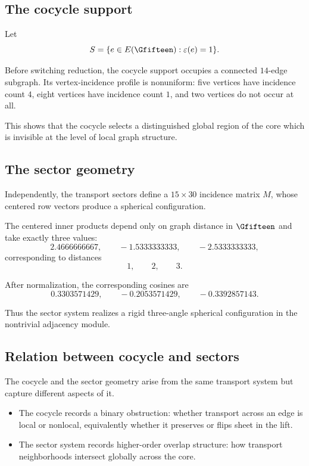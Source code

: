 \subsection{The cocycle support}

Let
\[
S = \{ e \in E(\Gfifteen) : \varepsilon(e) = 1 \}.
\]

Before switching reduction, the cocycle support occupies a connected
$14$-edge subgraph. Its vertex-incidence profile is nonuniform: five
vertices have incidence count $4$, eight vertices have incidence count
$1$, and two vertices do not occur at all.

This shows that the cocycle selects a distinguished global region of the
core which is invisible at the level of local graph structure.

\subsection{The sector geometry}

Independently, the transport sectors define a $15\times 30$ incidence
matrix $M$, whose centered row vectors produce a spherical
configuration.

The centered inner products depend only on graph distance in
$\Gfifteen$ and take exactly three values:
\[
2.4666666667,\qquad -1.5333333333,\qquad -2.5333333333,
\]
corresponding to distances
\[
1,\qquad 2,\qquad 3.
\]

After normalization, the corresponding cosines are
\[
0.3303571429,\qquad -0.2053571429,\qquad -0.3392857143.
\]

Thus the sector system realizes a rigid three-angle spherical
configuration in the nontrivial adjacency module.

\subsection{Relation between cocycle and sectors}

The cocycle and the sector geometry arise from the same transport system
but capture different aspects of it.

\begin{itemize}
\item The cocycle records a binary obstruction: whether transport across
an edge is local or nonlocal, equivalently whether it preserves or flips
sheet in the lift.

\item The sector system records higher-order overlap structure: how
transport neighborhoods intersect globally across the core.
\end{itemize}

